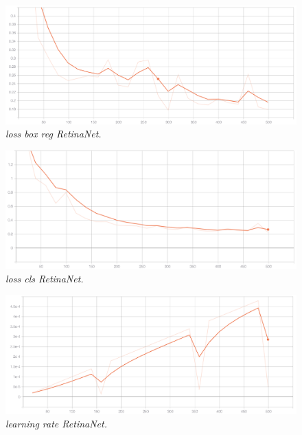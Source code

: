 \begin{figure}[h!]
\begin{center} 
\includegraphics[scale=0.35]{figures/loss_box_reg_retinanet_3}
\caption{\small \sl loss box reg RetinaNet. \label{fig:loss_box_reg_retinanet}}
\end{center}
\end{figure}

\begin{figure}[h!]
\begin{center} 
\includegraphics[scale=0.35]{figures/loss_cls_retinanet_4}
\caption{\small \sl loss cls RetinaNet. \label{fig:loss_cls_retinanet}}
\end{center}
\end{figure}

\begin{figure}[h!]
\begin{center} 
\includegraphics[scale=0.35]{figures/lr_retinanet_5}
\caption{\small \sl learning rate RetinaNet. \label{fig:lr_retinanet}}
\end{center}
\end{figure}


